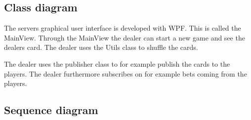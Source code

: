 \FloatBarrier

\subsection{Class diagram}
The servers graphical user interface is developed with WPF. This is called the MainView. Through the MainView the dealer can start a new game and see the dealers card. The dealer uses the Utils class to shuffle the cards. 

The dealer uses the publisher class to for example publish the cards to the players. The dealer furthermore subscribes on for example bets coming from the players.

\FloatBarrier

\subsection{Sequence diagram}